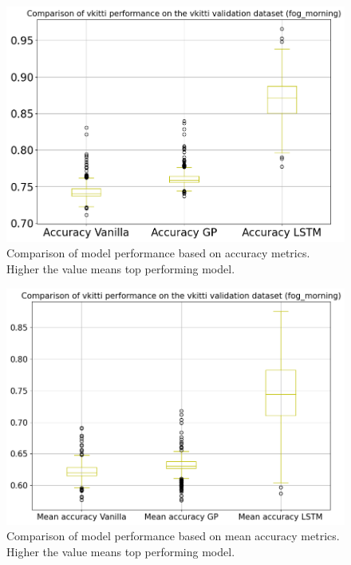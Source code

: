 	\begin{figure}[h]
		\centering
	
		\includegraphics[width=12cm]{images/two_vkitti_acc.png}
		\caption{Comparison of model performance based on accuracy metrics. Higher the value means top performing model.}
		\label{fig:performance_metric_unet}
	\end{figure}

	\begin{figure}[h]
		\centering
	
		\includegraphics[width=12cm]{images/two_vkitti_meanacc.png}
		\caption{Comparison of model performance based on mean accuracy metrics. Higher the value means top performing model.}
		\label{fig:performance_metric_unet}
	\end{figure}

